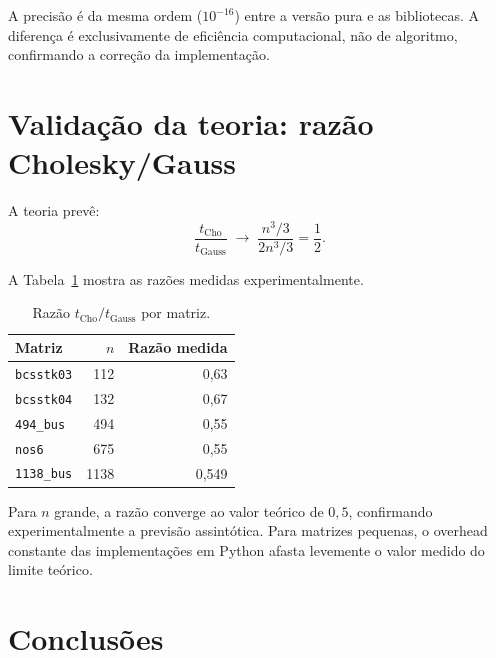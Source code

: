 \documentclass[12pt, a4paper]{article}
\begin{document}
A precisão é da mesma ordem ($10^{-16}$) entre a versão pura e as bibliotecas.
A diferença é exclusivamente de eficiência computacional, não de algoritmo,
confirmando a correção da implementação.
 
\section{Validação da teoria: razão Cholesky/Gauss}
 
A teoria prevê:
\begin{equation}
  \frac{t_{\text{Cho}}}{t_{\text{Gauss}}} \;\longrightarrow\;
  \frac{n^3/3}{2n^3/3} = \frac{1}{2}.
  \label{eq:razao}
\end{equation}
 
A Tabela~\ref{tab:razao} mostra as razões medidas experimentalmente.
 
\begin{table}[H]
  \centering
  \caption{Razão $t_{\text{Cho}}/t_{\text{Gauss}}$ por matriz.}
  \label{tab:razao}
  \renewcommand{\arraystretch}{1.3}
  \begin{tabular}{lrr}
    \toprule
    \textbf{Matriz} & \textbf{$n$} & \textbf{Razão medida} \\
    \midrule
    \texttt{bcsstk03}  & 112  & 0{,}63 \\
    \texttt{bcsstk04}  & 132  & 0{,}67 \\
    \texttt{494\_bus}  & 494  & 0{,}55 \\
    \texttt{nos6}      & 675  & 0{,}55 \\
    \texttt{1138\_bus} & 1138 & 0{,}549 \\
    \bottomrule
  \end{tabular}
\end{table}
 
Para $n$ grande, a razão converge ao valor teórico de $0{,}5$, confirmando
experimentalmente a previsão assintótica. Para matrizes pequenas, o overhead constante
das implementações em Python afasta levemente o valor medido do limite teórico.
 
\section{Conclusões}
 
\end{document}
